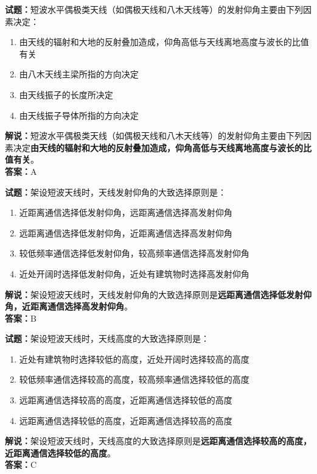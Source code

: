 \documentclass{ctexbook}
\begin{document}
\bigskip


\noindent\textbf{试题：}短波水平偶极类天线（如偶极天线和八木天线等）的发射仰角主要由下列因素决定：
\begin{enumerate}[leftmargin=3em]
\item 由天线的辐射和大地的反射叠加造成，仰角高低与天线离地高度与波长的比值有关
\item 由八木天线主梁所指的方向决定
\item 由天线振子的长度所决定
\item 由天线振子导体所指的方向决定
\end{enumerate}
\noindent\textbf{解说：}短波水平偶极类天线（如偶极天线和八木天线等）的发射仰角主要由下列因素决定\textbf{由天线的辐射和大地的反射叠加造成，仰角高低与天线离地高度与波长的比值有关}。\\\noindent\textbf{答案：}A



\bigskip


\noindent\textbf{试题：}架设短波天线时，天线发射仰角的大致选择原则是：
\begin{enumerate}[leftmargin=3em]
\item 近距离通信选择低发射仰角，远距离通信选择高发射仰角
\item 远距离通信选择低发射仰角，近距离通信选择高发射仰角
\item 较低频率通信选择低发射仰角，较高频率通信选择高发射仰角
\item 近处开阔时选择低发射仰角，近处有建筑物时选择高发射仰角
\end{enumerate}
\noindent\textbf{解说：}架设短波天线时，天线发射仰角的大致选择原则是\textbf{远距离通信选择低发射仰角，近距离通信选择高发射仰角}。\\\noindent\textbf{答案：}B




\bigskip


\noindent\textbf{试题：}架设短波天线时，天线高度的大致选择原则是：
\begin{enumerate}[leftmargin=3em]
\item 近处有建筑物时选择较低的高度，近处开阔时选择较高的高度
\item 较低频率通信选择较高的高度，较高频率通信选择较低的高度
\item 远距离通信选择较高的高度，近距离通信选择较低的高度
\item 远距离通信选择较低的高度，近距离通信选择较高的高度
\end{enumerate}
\noindent\textbf{解说：}架设短波天线时，天线高度的大致选择原则是\textbf{远距离通信选择较高的高度，近距离通信选择较低的高度}。\\\noindent\textbf{答案：}C
\end{document}
